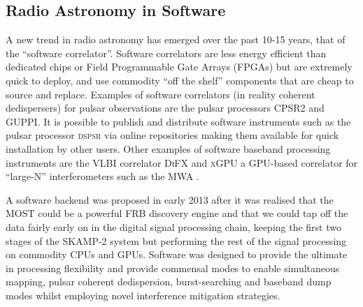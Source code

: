 \subsection{Radio Astronomy in Software}
A new trend in radio astronomy has emerged over the past 10-15 years, that of the ``software correlator''. Software correlators are less energy efficient than dedicated chips or Field Programmable Gate Arrays (FPGAs) but are extremely quick to deploy, and use commodity ``off the shelf'' components that are cheap to source and replace. Examples of software correlators (in reality coherent dedispersers) for pulsar observations are the pulsar processors CPSR2 \citep{Bailes_2009} and GUPPI\citep{DuPlain_2008}. It is possible to publish and distribute software instruments such as the pulsar processor \textsc{dspsr} \citep{van_Straten_2011} via online repositories making them available for quick installation by other users. Other examples of software baseband processing instruments are the VLBI correlator \textsc{DiFX} \citep{Deller_2007} 
 and \textsc{xGPU} a GPU-based correlator for ``large-N'' interferometers \citep{Clark_2012} such as the MWA \citep{Tingay_2013}. 

A software backend was proposed in early 2013 after it was realised that the MOST could be a powerful FRB discovery engine and that we could tap off the data fairly early on in the digital signal processing chain, keeping the first two stages of the SKAMP-2 system but performing the rest of the signal processing on commodity CPUs and GPUs. Software was designed to provide the ultimate in processing flexibility and provide commensal modes to enable simultaneous mapping, pulsar coherent dedispersion, burst-searching and baseband dump modes whilst employing novel interference mitigation strategies.